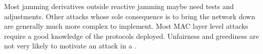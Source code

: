 Most jamming derivatives outside reactive jamming maybe need tests and adjustments.
Other attacks whose sole consequence is to bring the network down are generally much more complex to implement.
Most MAC layer level attacks require a good knowledge of the protocols deployed.
Unfairness and greediness are not very likely to motivate an attack in a \wsn.
